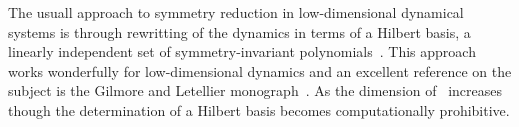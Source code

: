 

The usuall approach to symmetry reduction in low-dimensional dynamical systems
is through rewritting of the dynamics in terms of a Hilbert basis, a linearly
independent set of symmetry-invariant polynomials~\cite{GL-Gil07b,gatermannHab,ChossLaut00}.
This approach works wonderfully for low-dimensional dynamics and an excellent reference
on the subject is the Gilmore and Letellier monograph~\cite{GL-Gil07b}. As the dimension
of  \statesp\ increases though the determination of a Hilbert basis becomes computationally 
prohibitive. 